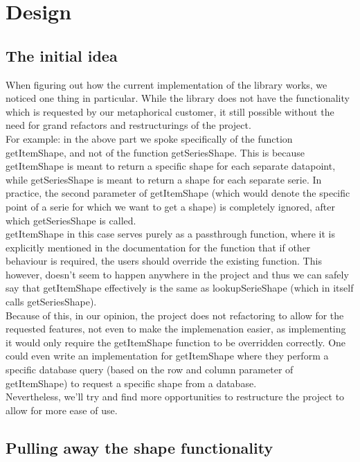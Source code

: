\documentclass{article}
\begin{document}
\section{Design}

\subsection{The initial idea}

When figuring out how the current implementation of the library works, we noticed one thing in particular. While the library does not have the functionality which is requested by our metaphorical customer, it still possible without the need for grand refactors and restructurings of the project.\\

For example: in the above part we spoke specifically of the function getItemShape, and not of the function getSeriesShape. This is because getItemShape is meant to return a specific shape for each separate datapoint, while getSeriesShape is meant to return a shape for each separate serie. In practice, the second parameter of getItemShape (which would denote the specific point of a serie for which we want to get a shape) is completely ignored, after which getSeriesShape is called.\\

getItemShape in this case serves purely as a passthrough function, where it is explicitly mentioned in the documentation for the function that if other behaviour is required, the users should override the existing function. This however, doesn't seem to happen anywhere in the project and thus we can safely say that getItemShape effectively is the same as lookupSerieShape (which in itself calls getSeriesShape).\\

Because of this, in our opinion, the project does not refactoring to allow for the requested features, not even to make the implemenation easier, as implementing it would only require the getItemShape function to be overridden correctly. One could even write an implementation for getItemShape where they perform a specific database query (based on the row and column parameter of getItemShape) to request a specific shape from a database.\\

Nevertheless, we'll try and find more opportunities to restructure the project to allow for more ease of use.

\subsection{Pulling away the shape functionality}
\end{document}
